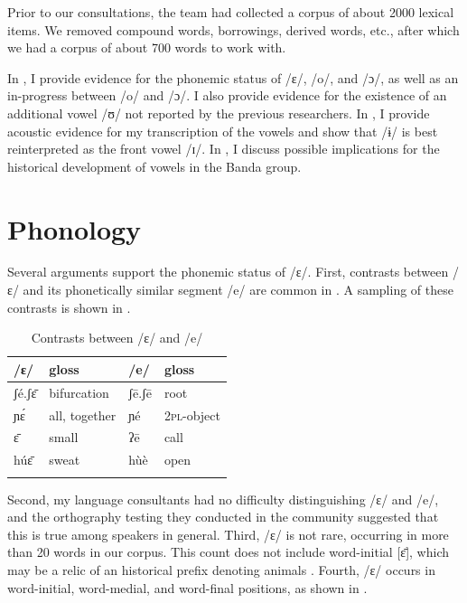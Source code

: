 \documentclass[output=paper,colorlinks,citecolor=brown]{langscibook}
\begin{document}
Prior to our consultations, the team had collected a corpus of about 2000 lexical items. We removed compound words, borrowings, derived words, etc., after which we had a corpus of about 700 words to work with.

In , I provide evidence for the phonemic status of /ɛ/, /o/, and /ɔ/, as well as an in-progress  between /o/ and /ɔ/. I also provide evidence for the existence of an additional vowel /ʊ/ not reported by the previous researchers. In , I provide acoustic evidence for my transcription of the vowels and show that /ɨ/ is best reinterpreted as the front vowel /ɪ/. In , I discuss possible implications for the historical development of vowels in the Banda group.

\section{Phonology}\label{sec:olson:2}

Several arguments support the phonemic status of /ɛ/. First, contrasts between /ɛ/ and its phonetically similar segment /e/ are common in . A sampling of these contrasts is shown in .

\begin{table}
\caption{Contrasts between /ɛ/ and /e/}
\label{tab:olson:4}
    \begin{tabular}{llll}
    \lsptoprule
        /ɛ/ & gloss & /e/  & gloss\\
    \midrule
        ʃé.ʃɛ̄ & bifurcation & ʃē.ʃē & root\\
        ɲɛ́  & all, together & ɲé    & \textsc{2pl}-object\\
        ɛ̄     & small       & ʔē    & call\\
        húɛ̄   & sweat       & hùè   & open\\
    \lspbottomrule
    \end{tabular}
\end{table}

\begin{sloppypar}
Second, my language consultants had no difficulty distinguishing /ɛ/ and /e/, and the orthography testing they conducted in the  community suggested that this is true among  speakers in general. Third, /ɛ/ is not rare, occurring in more than 20 words in our corpus. This count does not include word-initial [ɛ̄], which may be a relic of an historical prefix denoting animals \citep[13]{Greenberg1970}. Fourth, /ɛ/ occurs in word-initial, word-medial, and word-final positions, as shown in .
\end{sloppypar}
\end{document}
